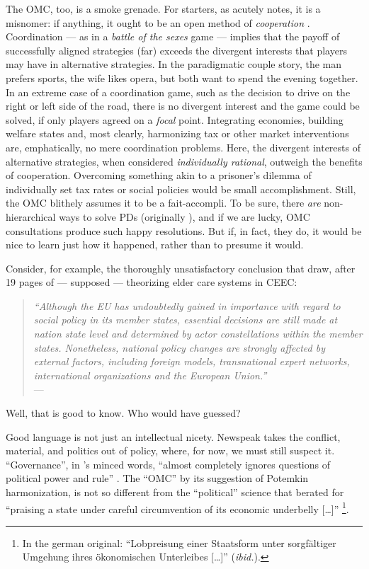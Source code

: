 \documentclass[11pt,a4paper,oneside,openright]{article}
\begin{document}
The \gls{OMC}, too, is a smoke grenade. 
For starters, as \citeauthor{Offe2003} acutely notes, it is a misnomer: 
if anything, it ought to be an open method of \emph{cooperation} \citeyearpar[467]{Offe2003}. 
Coordination --- as in a \emph{battle of the sexes} game --- implies that the payoff of successfully aligned strategies (far) exceeds the divergent interests that players may have in alternative strategies. 
In the paradigmatic couple story, the man prefers sports, the wife likes opera, but both want to spend the evening together. 
In an extreme case of a coordination game, such as the decision to drive on the right or left side of the road, there is no divergent interest and the game could be solved, if only players agreed on a \emph{focal} point. 
Integrating economies, building welfare states and, most clearly, harmonizing tax or other market interventions are, emphatically, no mere coordination problems. 
Here, the divergent interests of alternative strategies, when considered \emph{individually rational}, outweigh the benefits of cooperation. 
Overcoming something akin to a prisoner's dilemma of individually set tax rates or social policies would be small accomplishment. 
Still, the \gls{OMC} blithely assumes it to be a fait-accompli. 
To be sure, there \emph{are} non-hierarchical ways to solve \glspl{PD} (originally \citealt{Axelrod1980}), and if we are lucky, \gls{OMC} consultations produce such happy resolutions. 
But if, in fact, they do, it would be nice to learn just how it happened, rather than to presume it would. 

Consider, for example, the thoroughly unsatisfactory conclusion that \citeauthor{Theobald2009} draw, after 19 pages of --- supposed --- theorizing elder care systems in \gls{CEEC}:
\begin{quote}
	\emph{``Although the EU has undoubtedly gained in importance with regard to social policy in its member states, essential decisions are still made at nation­ state level and determined by actor constellations within the member states. 
	Nonetheless, national policy changes are strongly affected by external factors, including foreign models, transnational expert networks, international organizations and the European Union.''}\\
	--- \citeyear[163]{Theobald2009}
\end{quote}
Well, that is good to know. 
Who would have guessed?

Good language is not just an intellectual nicety. 
Newspeak takes the conflict, material, and politics out of policy, where, for now, we must still suspect it. 
``Governance'', in \citeauthor{Jachtenfuchs2001}'s minced words, ``almost completely ignores questions of political power and rule'' \citeyearpar[258]{Jachtenfuchs2001}. 
The ``\gls{OMC}'' by its suggestion of Potemkin harmonization, is not so different from the ``political'' science that \cite{Agnoli-1989-aa} berated for ``praising a state under careful circumvention of its economic underbelly [\ldots]'' \citeyearpar[195]{Agnoli-1989-aa}
\footnote{
	In the german original: 
	``Lobpreisung einer Staatsform unter sorgf\"{a}ltiger Umgehung ihres \"{o}konomischen Unterleibes [\ldots]'' (\emph{ibid.}).
}.
\end{document}
